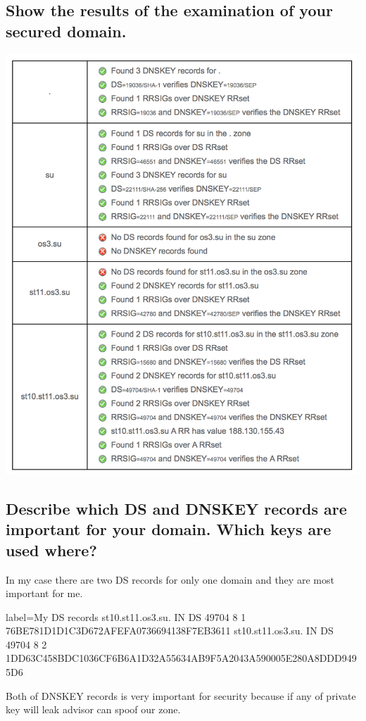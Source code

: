 \documentclass[a4paper,11pt]{article}
\begin{document}
\subsection{Show the results of the examination of your secured domain.}
\includegraphics{zone-verification}

\subsection{Describe which DS and DNSKEY records are important for your domain. Which keys are used where?}
In my case there are two DS records for only one domain and they are most important for me.

\begin{bashcode*}{label=My DS records}
st10.st11.os3.su. IN DS 49704 8 1 76BE781D1D1C3D672AFEFA0736694138F7EB3611
st10.st11.os3.su. IN DS 49704 8 2 1DD63C458BDC1036CF6B6A1D32A55634AB9F5A2043A590005E280A8DDD9495D6
\end{bashcode*}
Both of DNSKEY records is very important for security because if any of private key will leak advisor can spoof our zone.
\end{document}
